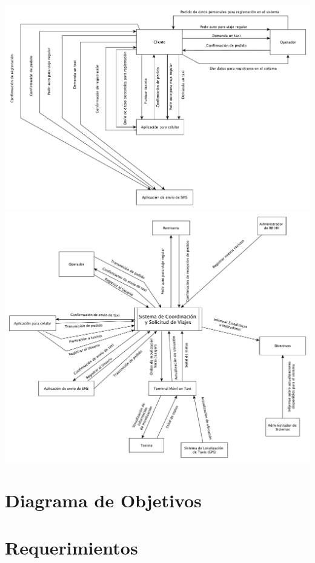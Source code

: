\documentclass[a4paper]{article}
\begin{document}
\begin{center}
\includegraphics[scale=0.6,angle=90]{diagrama_contexto_1.pdf}
\includegraphics[scale=0.5]{diagrama_contexto_2.pdf}
\end{center}

\section{Diagrama de Objetivos}

\section{Requerimientos}
\end{document}
